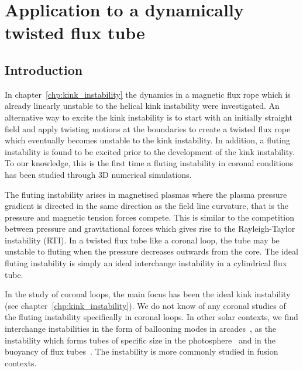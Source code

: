 \chapter{Application to a dynamically twisted flux tube}

\label{chp:kink_instability_straight}

\graphicspath{{images/kink_instability_straight/}}

\section{Introduction}

In chapter~\ref{chp:kink_instability} the dynamics in a magnetic flux rope which is already linearly unstable to the helical kink instability were investigated. An alternative way to excite the kink instability is to start with an initially straight field and apply twisting motions at the boundaries to create a twisted flux rope which eventually becomes unstable to the kink instability. In addition, a fluting instability is found to be excited prior to the development of the kink instability. To our knowledge, this is the first time a fluting instability in coronal conditions has been studied through 3D numerical simulations. 

The fluting instability arises in magnetised plasmas where the plasma pressure gradient is directed in the same direction as the field line curvature, that is the pressure and magnetic tension forces compete. This is similar to the competition between pressure and gravitational forces which gives rise to the Rayleigh-Taylor instability (RTI). In a twisted flux tube like a coronal loop, the tube may be unstable to fluting when the pressure decreases outwards from the core. The ideal fluting instability is simply an ideal interchange instability in a cylindrical flux tube. 

In the study of coronal loops, the main focus has been the ideal kink instability (see chapter~\ref{chp:kink_instability}). We do not know of any coronal studies of the fluting instability specifically in coronal loops. In other solar contexts, we find interchange instabilities in the form of ballooning modes in arcades~\cite{hoodBallooningInstabilitiesSolar1986}, as the instability which forms tubes of specific size in the photosphere~\cite{bunteInterchangeInstabilitySolar1993} and in the buoyancy of flux tubes~\cite{schuesslerInterchangeInstabilitySmall1984}. The instability is more commonly studied in fusion contexts.

